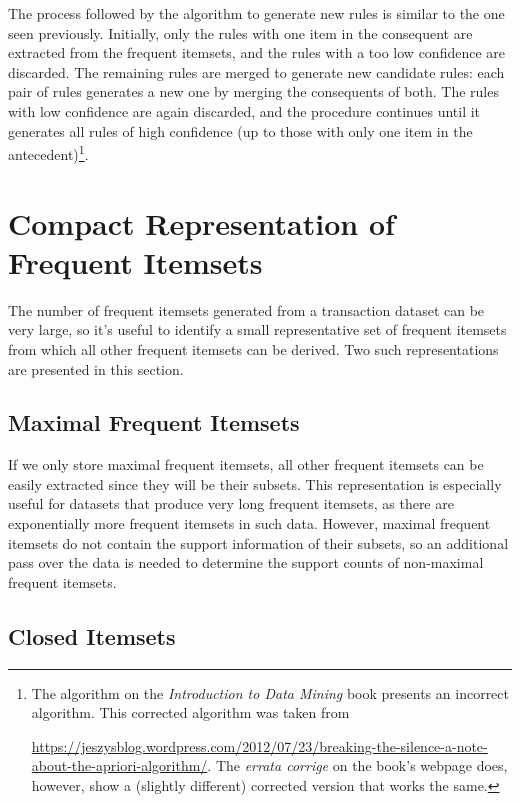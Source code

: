 The process followed by the algorithm to generate new rules is similar to the one seen previously. Initially, only the rules with one item in the consequent are extracted from the frequent itemsets, and the rules with a too low confidence are discarded. The remaining rules are merged to generate new candidate rules: each pair of rules generates a new one by merging the consequents of both. The rules with low confidence are again discarded, and the procedure continues until it generates all rules of high confidence (up to those with only one item in the antecedent)\footnote{The algorithm on the \textit{Introduction to Data Mining} book presents an incorrect algorithm. This corrected algorithm was taken from \raggedright\url{https://jeszysblog.wordpress.com/2012/07/23/breaking-the-silence-a-note-about-the-apriori-algorithm/}. The \textit{errata corrige} on the book's webpage does, however, show a (slightly different) corrected version that works the same.}. 

\section{Compact Representation of Frequent Itemsets}

The number of frequent itemsets generated from a transaction dataset can be very large, so it's useful to identify a small representative set of frequent itemsets from which all other frequent itemsets can be derived. Two such representations are presented in this section.

\subsection{Maximal Frequent Itemsets}


If we only store maximal frequent itemsets, all other frequent itemsets can be easily extracted since they will be their subsets. This representation is especially useful for datasets that produce very long frequent itemsets, as there are exponentially more frequent itemsets in such data. However, maximal frequent itemsets do not contain the support information of their subsets, so an additional pass over the data is needed to determine the support counts of non-maximal frequent itemsets.

\subsection{Closed Itemsets}

